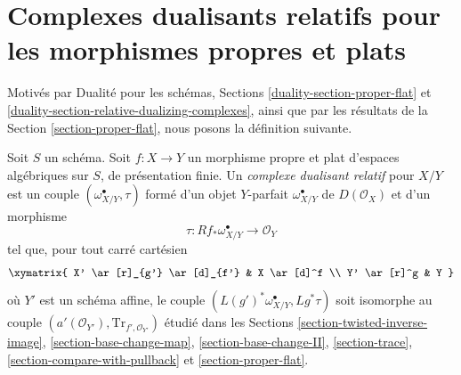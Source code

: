  
\section{Complexes dualisants relatifs pour les morphismes propres et plats}
\label{section-relative-dualizing-proper-flat}

\noindent
Motivés par Dualité pour les schémas, Sections
\ref{duality-section-proper-flat} et
\ref{duality-section-relative-dualizing-complexes},
ainsi que par les résultats de la
Section \ref{section-proper-flat},
nous posons la définition suivante.

\begin{definition}
\label{definition-relative-dualizing-proper-flat}
Soit $S$ un schéma. Soit $f : X \to Y$ un morphisme propre et plat
d'espaces algébriques sur $S$, de présentation finie.
Un {\it complexe dualisant relatif} pour $X/Y$ est un couple
$(\omega_{X/Y}^\bullet, \tau)$ formé d'un
objet $Y$-parfait $\omega_{X/Y}^\bullet$ de $D(\mathcal{O}_X)$
et d'un morphisme
$$
\tau : Rf_*\omega_{X/Y}^\bullet \longrightarrow \mathcal{O}_Y
$$
tel que, pour tout carré cartésien
$$
\xymatrix{
X' \ar[r]_{g'} \ar[d]_{f'} & X \ar[d]^f \\
Y' \ar[r]^g & Y
}
$$
où $Y'$ est un schéma affine, le couple
$(L(g')^*\omega_{X/Y}^\bullet, Lg^*\tau)$
soit isomorphe au couple
$(a'(\mathcal{O}_{Y'}), \text{Tr}_{f', \mathcal{O}_{Y'}})$
étudié dans les Sections
\ref{section-twisted-inverse-image},
\ref{section-base-change-map},
\ref{section-base-change-II},
\ref{section-trace},
\ref{section-compare-with-pullback} et
\ref{section-proper-flat}.
\end{definition}


